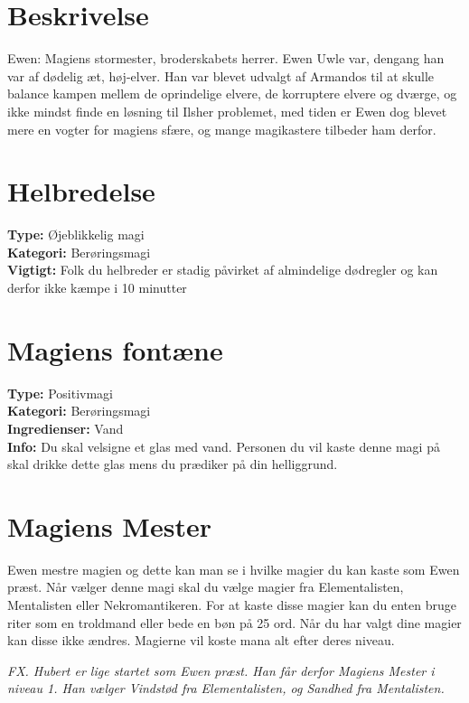 \section{Beskrivelse}
Ewen: Magiens stormester, broderskabets herrer. Ewen Uwle var, dengang han var af dødelig æt,
høj-elver. Han var blevet udvalgt af Armandos til at skulle balance kampen mellem de oprindelige
elvere, de korruptere elvere og dværge, og ikke mindst finde en løsning til Ilsher problemet, med tiden
er Ewen dog blevet mere en vogter for magiens sfære, og mange magikastere tilbeder ham derfor.

\section{Helbredelse}
\textbf{Type:} Øjeblikkelig magi \\
\textbf{Kategori:} Berøringsmagi\\
\textbf{Vigtigt:} Folk du helbreder er stadig påvirket af almindelige dødregler og kan derfor ikke kæmpe i 10 minutter

\section{Magiens fontæne}
\textbf{Type:} Positivmagi\\
\textbf{Kategori:} Berøringsmagi\\
\textbf{Ingredienser:} Vand\\
\textbf{Info:} Du skal velsigne et glas med vand. Personen du vil kaste denne magi på skal drikke dette glas mens du prædiker på din helliggrund.

\section{Magiens Mester}
Ewen mestre magien og dette kan man se i hvilke magier du kan kaste som Ewen præst. Når vælger denne magi skal du vælge magier fra Elementalisten, Mentalisten eller Nekromantikeren. For at kaste disse magier kan du enten bruge riter som en troldmand eller bede en bøn på 25 ord. Når du har valgt dine magier kan disse ikke ændres. Magierne vil koste mana alt efter deres niveau.

\textit{FX. Hubert er lige startet som Ewen præst. Han får derfor Magiens Mester i niveau 1. Han vælger Vindstød fra Elementalisten, og Sandhed fra Mentalisten.}

